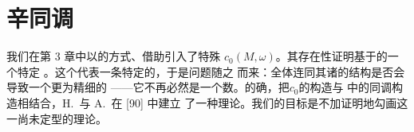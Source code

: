 
\section{辛同调}
\label{sec:symplectic-homology}

%
%

我们在第 3 章中以\trDynamics{}的方式、借助\trHamiltonianSystem{}引入了特殊\trSymplectic%
\trCapacity{}$c_{0}(M,\omega)$。其存在性证明基于\trActionFunctional{}的一个特定%
\trCriticalPoint。这个\trCriticalPoint{}代表一条特定的\trPeriodicOrbit，于是问题随之%
而来：全体\trCriticalPoint{}连同其诸\trConnectingOrbit{}的结构是否会导致一个更为精细的%
\trSymplecticInvariant——它不再必然是一个数。的确，把\trCapacity{}$c_{0}$的构造与%
\trLoopSpace{}中的\trFloer{}同调构造相结合，H.~\trHofer{}与 A.~\trFloer{}在 [90] 中建立%
了一种\trSymplectic\trHomology{}理论。我们的目标是不加证明地勾画这一尚未定型的理论。

